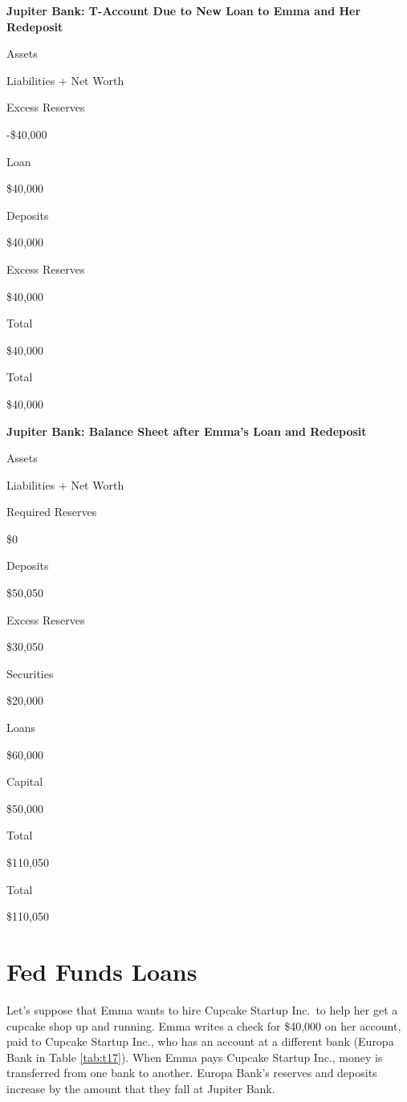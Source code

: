 \documentclass[
]{book}
\begin{document}
\label{tab:t14}\textbf{Jupiter Bank: T-Account Due to New Loan to Emma and Her Redeposit}

Assets

Liabilities + Net Worth

Excess Reserves

-\$40,000

Loan

\$40,000

Deposits

\$40,000

Excess Reserves

\$40,000

Total

\$40,000

Total

\$40,000

\label{tab:t15}\textbf{Jupiter Bank: Balance Sheet after Emma's Loan and Redeposit}

Assets

Liabilities + Net Worth

Required Reserves

\$0

Deposits

\$50,050

Excess Reserves

\$30,050

Securities

\$20,000

Loans

\$60,000

Capital

\$50,000

Total

\$110,050

Total

\$110,050

\hypertarget{fed-funds-loans}{%
\section{Fed Funds Loans}\label{fed-funds-loans}}

Let's suppose that Emma wants to hire Cupcake Startup Inc.~to help her get a cupcake shop up and running. Emma writes a check for \$40,000 on her account, paid to Cupcake Startup Inc., who has an account at a different bank (Europa Bank in Table \ref{tab:t17}). When Emma pays Cupcake Startup Inc., money is transferred from one bank to another. Europa Bank's reserves and deposits increase by the amount that they fall at Jupiter Bank.
\end{document}

